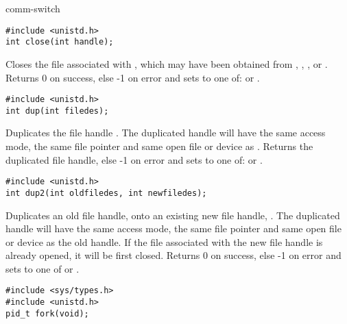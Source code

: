 \begin{Ventry2}{comm-switch  }
\item[close]
\label{item:close}
\begin{production}
\begin{verbatim}
#include <unistd.h>
int close(int handle);
\end{verbatim}
\end{production}


Closes the file associated with , which may have been
obtained from , , , or .
Returns 0 on success, else -1 on error and sets 
to one of:  or .
  

\item[dup]
\label{item:dup}
\begin{production}
\begin{verbatim}
#include <unistd.h>
int dup(int filedes);
\end{verbatim}
\end{production}

Duplicates the file handle . The duplicated handle will
have the same access mode, the same file pointer and same open file or
device as . Returns the duplicated file handle, else -1 on
error and sets  to one of:  or .

\item[dup2]
\label{item:dup2}
\begin{production}
\begin{verbatim}
#include <unistd.h>
int dup2(int oldfiledes, int newfiledes);
\end{verbatim}
\end{production}


Duplicates an old file handle,  onto an existing new
file handle, . The duplicated handle will have the same
access mode, the same file pointer and same open file or device as the
old handle.  If the file associated with the new file handle is
already opened, it will be first closed. Returns 0 on success, else -1
on error and sets  to one of  or .


\item[fork]
\label{item:fork}
\begin{production}
\begin{verbatim}
#include <sys/types.h>
#include <unistd.h>
pid_t fork(void);
\end{verbatim}
\end{production}


\end{Ventry2}

